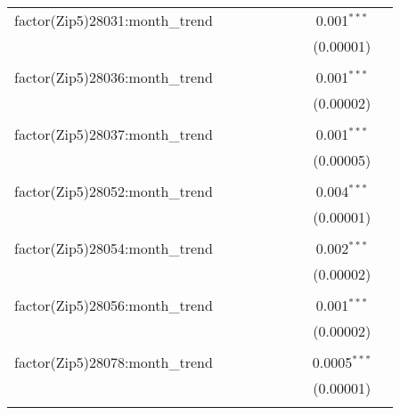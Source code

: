 \begin{table}[H]
{\begin{tabular}{@{\extracolsep{5pt}}lcccccccc}
  factor(Zip5)28031:month\_trend &  &  &  &  &  &  & 0.001$^{***}$ &  \\  

   &  &  &  &  &  &  & (0.00001) &  \\  

   & & & & & & & & \\  

  factor(Zip5)28036:month\_trend &  &  &  &  &  &  & 0.001$^{***}$ &  \\  

   &  &  &  &  &  &  & (0.00002) &  \\  

   & & & & & & & & \\  

  factor(Zip5)28037:month\_trend &  &  &  &  &  &  & 0.001$^{***}$ &  \\  

   &  &  &  &  &  &  & (0.00005) &  \\  

   & & & & & & & & \\  

  factor(Zip5)28052:month\_trend &  &  &  &  &  &  & 0.004$^{***}$ &  \\  

   &  &  &  &  &  &  & (0.00001) &  \\  

   & & & & & & & & \\  

  factor(Zip5)28054:month\_trend &  &  &  &  &  &  & 0.002$^{***}$ &  \\  

   &  &  &  &  &  &  & (0.00002) &  \\  

   & & & & & & & & \\  

  factor(Zip5)28056:month\_trend &  &  &  &  &  &  & 0.001$^{***}$ &  \\  

   &  &  &  &  &  &  & (0.00002) &  \\  

   & & & & & & & & \\  

  factor(Zip5)28078:month\_trend &  &  &  &  &  &  & 0.0005$^{***}$ &  \\  

   &  &  &  &  &  &  & (0.00001) &  \\  

   & & & & & & & & \\  


\end{tabular}}
\end{table}
